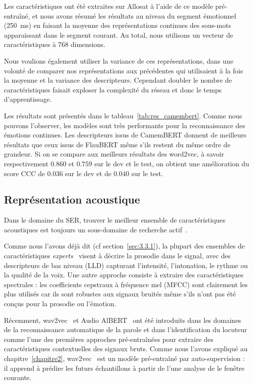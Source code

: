 Les caractéristiques ont été extraites sur Allosat à l'aide de ce modèle pré-entraîné, et nous avons résumé les résultats au niveau du segment émotionnel (250~ms) en faisant la moyenne des représentations continues des sous-mots apparaissant dans le segment courant. Au total, nous utilisons un vecteur de caractéristiques à 768 dimensions.

Nous voulions également utiliser la variance de ces représentations, dans une volonté de comparer nos représentations aux précédentes qui utilisaient à la fois la moyenne et la variance des descripteurs. Cependant doubler le nombre de caractéristiques faisait exploser la complexité du réseau et donc le temps d'apprentissage.

Les résultats sont présentés dans le tableau~\ref{tab:res_camembert}. Comme nous pouvons l'observer, les modèles sont très performants pour la reconnaissance des émotions continues. Les descripteurs issus de CamemBERT donnent de meilleurs résultats que ceux issus de FlauBERT même s'ils restent du même ordre de grandeur. Si on se compare aux meilleurs résultats des word2vec, à savoir respectivement $0.860$ et $0.759$ sur le dev et le test, on obtient une amélioration du score CCC de 0$.036$ sur le dev et de $0.040$ sur le test.



\subsection{Représentation acoustique}
Dans le domaine du SER, trouver le meilleur ensemble de caractéristiques acoustiques est toujours un sous-domaine de recherche actif~\cite{Jing2018}.

Comme nous l'avons déjà dit (cf section~\ref{sec:3.3.1}), la plupart des ensembles de caractéristiques \textit{experts}~\cite{Eyben2016,Schuller2013} visent à décrire la prosodie dans le signal, avec des descripteurs de bas niveau (LLD) capturant l'intensité, l'intonation, le rythme ou la qualité de la voix.
Une autre approche consiste à extraire des caractéristiques spectrales : les coefficients cepstraux à fréquence mel (MFCC) sont clairement les plus utilisés car ils sont robustes aux signaux bruités même s'ils n'ont pas été conçus pour la prosodie ou l'émotion.

Récemment, wav2vec~\cite{Schneider2019} et Audio AlBERT~\cite{Chi2020} ont été introduits dans les domaines de la reconnaissance automatique de la parole et dans l'identification du locuteur comme l'une des premières approches pré-entraînées pour extraire des caractéristiques contextuelles des signaux bruts.
Comme nous l'avons expliqué au chapitre~\ref{chapitre2}, wav2vec~\cite{Schneider2019} est un modèle pré-entraîné par auto-supervision : il apprend à prédire les futurs échantillons à partir de l'une analyse de le fenêtre courante.

